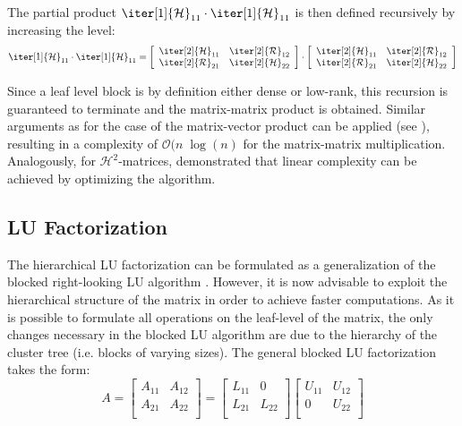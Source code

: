 \noindent The partial product $\iter[1]{\mathcal{H}}_{11} \cdot \iter[1]{\mathcal{H}}_{11}$ is then defined recursively by increasing the level:
\begin{equation}
    \iter[1]{\mathcal{H}}_{11} \cdot \iter[1]{\mathcal{H}}_{11}= 
      \left[
    \begin{array}{cc}
       \iter[2]{\mathcal{H}}_{11}& \iter[2]{\mathcal{R}}_{12} \\
      \iter[2]{\mathcal{R}}_{21} & \iter[2]{\mathcal{H}}_{22} \\
    \end{array}
  \right] \cdot 
  \left[
    \begin{array}{cc}
       \iter[2]{\mathcal{H}}_{11}& \iter[2]{\mathcal{R}}_{12} \\
      \iter[2]{\mathcal{R}}_{21} & \iter[2]{\mathcal{H}}_{22} \\
    \end{array}
  \right]
\end{equation}

\noindent Since a leaf level block is by definition either dense or low-rank, this recursion is guaranteed to terminate and the matrix-matrix product is obtained. Similar arguments as for the case of the matrix-vector product can be applied (see \cite{hackbusch_hierarchical_2015}), resulting in a complexity of $\mathcal{O}(n \;\log(n)$ for the matrix-matrix multiplication.
Analogously, for $\mathcal{H}^2$-matrices, \cite{borm_h2-matrix_2006} demonstrated that linear complexity can be achieved by optimizing the algorithm.


\subsection{LU Factorization}
\label{sec:h_lu}
The hierarchical LU factorization can be formulated as a generalization of the blocked right-looking LU algorithm \cite{carratala-saez_exploiting_2019}. However, it is now advisable to exploit the hierarchical structure of the matrix in order to achieve faster computations. As it is possible to formulate all operations on the leaf-level of the matrix, the only changes necessary in the blocked LU algorithm are due to the hierarchy of the cluster tree (i.e. blocks of varying sizes). The general blocked LU factorization takes the form:
\begin{equation}
    A = 
  \left[
    \begin{array}{cc}
      A_{11}& A_{12} \\
      A_{21} & A_{22} \\
    \end{array}
  \right] = 
  \left[
    \begin{array}{cc}
      L_{11}& 0 \\
      L_{21} & L_{22} \\
    \end{array}
  \right]
  \left[
    \begin{array}{cc}
       U_{11}& U_{12} \\
       0 & U_{22} \\
    \end{array}
  \right]
\end{equation}

